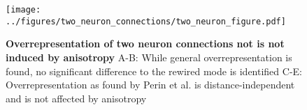 

\begin{figure}[h]
\texttt{[image: ../figures/two\_neuron\_connections/two\_neuron\_figure.pdf]} %
\caption{{\bf Overrepresentation of two neuron connections not is not
    induced by anisotropy}
A-B: While general overrepresentation is found, no significant
difference to the rewired mode is identified C-E: Overrepresentation
as found by Perin et al. is distance-independent and is not affected
by anisotropy}
\label{fig_two_neuron}%
\end{figure}


